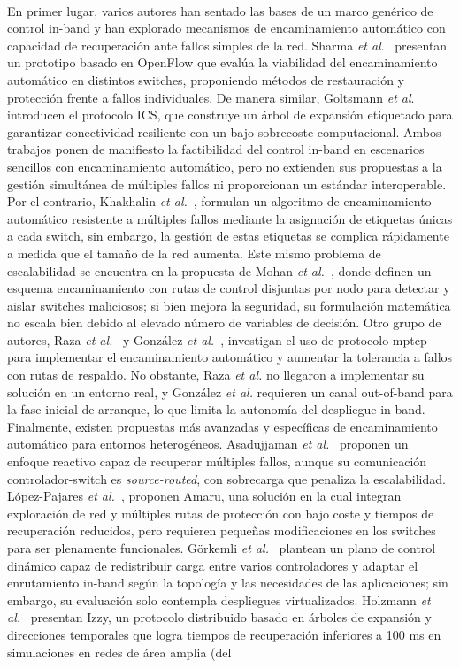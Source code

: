\\ %
En primer lugar, varios autores han sentado las bases de un marco genérico de control in-band y han explorado mecanismos de encaminamiento automático con capacidad de recuperación ante fallos simples de la red. Sharma \textit{et al}.~\cite{Sharma16} presentan un prototipo basado en OpenFlow que evalúa la viabilidad del encaminamiento automático en distintos switches, proponiendo métodos de restauración y protección frente a fallos individuales. De manera similar, Goltsmann \textit{et al}.~\cite{Goltsmann17} introducen el protocolo ICS, que construye un árbol de expansión etiquetado para garantizar conectividad resiliente con un bajo sobrecoste computacional. Ambos trabajos ponen de manifiesto la factibilidad del control in-band en escenarios sencillos con encaminamiento automático, pero no extienden sus propuestas a la gestión simultánea de múltiples fallos ni proporcionan un estándar interoperable. Por el contrario, Khakhalin \textit{et al.}~\cite{Khakhalin17}, formulan un algoritmo de encaminamiento automático resistente a múltiples fallos mediante la asignación de etiquetas únicas a cada switch, sin embargo, la gestión de estas etiquetas se complica rápidamente a medida que el tamaño de la red aumenta. Este mismo problema de escalabilidad se encuentra en la propuesta de Mohan \textit{et al.}~\cite{Mohan18}, donde definen un esquema encaminamiento con rutas de control disjuntas por nodo para detectar y aislar switches maliciosos; si bien mejora la seguridad, su formulación matemática no escala bien debido al elevado número de variables de decisión. Otro grupo de autores, Raza \textit{et al.}~\cite{Raza17} y González \textit{et al.}~\cite{Gonzalez18},  investigan el uso de protocolo \gls{mptcp} para implementar el encaminamiento automático y aumentar la tolerancia a fallos con rutas de respaldo. No obstante, Raza \textit{et al.} no llegaron a implementar su solución en un entorno real, y González \textit{et al.} requieren un canal out-of-band para la fase inicial de arranque, lo que limita la autonomía del despliegue in-band. Finalmente, existen propuestas más avanzadas y específicas de encaminamiento automático para entornos heterogéneos.  Asadujjaman \textit{et al.}~\cite{Asadujjaman18} proponen un enfoque reactivo capaz de recuperar múltiples fallos, aunque su comunicación controlador-switch es \textit{source-routed}, con sobrecarga que penaliza la escalabilidad. López-Pajares \textit{et al.}~\cite{Lopez-Pajares19}, proponen Amaru, una solución en la cual integran exploración de red y múltiples rutas de protección con bajo coste y tiempos de recuperación reducidos, pero requieren pequeñas modificaciones en los switches para ser plenamente funcionales. Görkemli \textit{et al.}~\cite{Gorkemli18} plantean un plano de control dinámico capaz de redistribuir carga entre varios controladores y adaptar el enrutamiento in-band según la topología y las necesidades de las aplicaciones; sin embargo, su evaluación solo contempla despliegues virtualizados. Holzmann \textit{et al.}~\cite{Holzmann19} presentan Izzy, un protocolo distribuido basado en árboles de expansión y direcciones temporales que logra tiempos de recuperación inferiores a 100 ms en simulaciones en redes de área amplia (del 